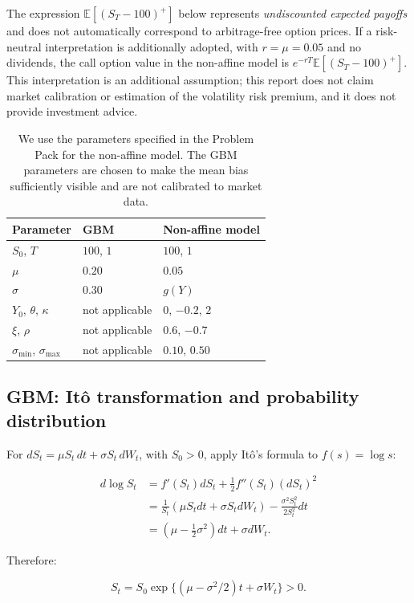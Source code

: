 The expression $\mathbb{E}[(S_T-100)^+]$ below represents \emph{undiscounted expected payoffs} and does not automatically correspond to arbitrage-free option prices. If a risk-neutral interpretation is additionally adopted, with $r=\mu=0.05$ and no dividends, the call option value in the non-affine model is $e^{-rT}\mathbb{E}[(S_T-100)^+]$. This interpretation is an additional assumption; this report does not claim market calibration or estimation of the volatility risk premium, and it does not provide investment advice.

\begin{table}[ht]\centering
\caption{We use the parameters specified in the Problem Pack for the non-affine model. The GBM parameters are chosen to make the mean bias sufficiently visible and are not calibrated to market data.}
\begin{tabular}{lll}\toprule
Parameter & GBM & Non-affine model\\\midrule
$S_0$, $T$ & $100$, $1$ & $100$, $1$\\
$\mu$ & $0.20$ & $0.05$\\
$\sigma$ & $0.30$ & $g(Y)$\\
$Y_0$, $\theta$, $\kappa$ & not applicable & $0$, $-0.2$, $2$\\
$\xi$, $\rho$ & not applicable & $0.6$, $-0.7$\\
$\sigma_{\min}$, $\sigma_{\max}$ & not applicable & $0.10$, $0.50$\\\bottomrule
\end{tabular}
\end{table}

\subsection{GBM: It\^o transformation and probability distribution}

For $dS_t=\mu S_t\,dt+\sigma S_t\,dW_t$, with $S_0>0$, apply It\^o's formula to $f(s)=\log s$:

\begin{align}
d\log S_t&=f'(S_t)dS_t+\tfrac12 f''(S_t)(dS_t)^2\\
 &=\frac1{S_t}(\mu S_tdt+\sigma S_tdW_t)-\frac{\sigma^2 S_t^2}{2S_t^2}dt\\
 &=(\mu-\tfrac12\sigma^2)dt+\sigma dW_t.
\end{align}

Therefore:

\begin{equation}\label{eq:gbmexact}
S_t=S_0\exp\{(\mu-\sigma^2/2)t+\sigma W_t\}>0.
\end{equation}

